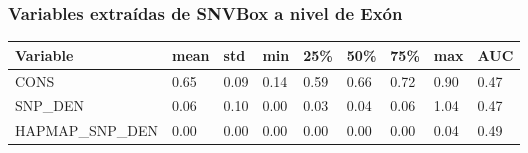 \subsubsection{Variables extraídas de SNVBox a nivel de Exón}
\begin{table}[H]
\centering
\begin{tabular}{|l|l|l|l|l|l|l|l|l|}
\hline
Variable         & mean & std  & min  & 25\% & 50\% & 75\% & max & AUC  \\ \hline
CONS             & 0.65 & 0.09 & 0.14 & 0.59 & 0.66 & 0.72 & 0.90 & 0.47 \\ \hline
SNP\_DEN         & 0.06 & 0.10 & 0.00 & 0.03 & 0.04 & 0.06 & 1.04 & 0.47 \\ \hline
HAPMAP\_SNP\_DEN & 0.00 & 0.00 & 0.00 & 0.00 & 0.00 & 0.00 & 0.04 & 0.49 \\ \hline
\end{tabular}
\end{table}



